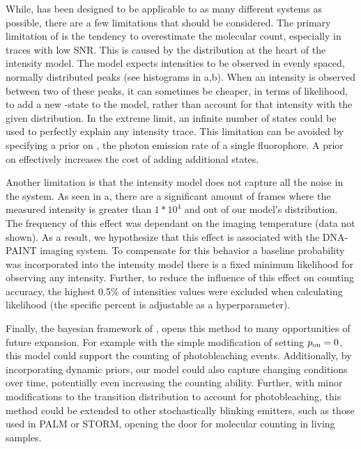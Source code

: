 While, \ours has been designed to be applicable to as many different systems as possible, 
there are a few limitations that should be considered.
    The primary limitation of \ours is the tendency to overestimate the molecular count, 
    especially in traces with low SNR. 
    This is caused by the distribution at the heart of the intensity model. 
    The model expects intensities to be observed in evenly spaced, normally distributed 
    peaks (see histograms in a,b).
    When an intensity is observed between two of these peaks, it can sometimes be cheaper, 
    in terms of likelihood, to add a new \z{}-state to the model,
    rather than account for that intensity with the given distribution.
    In the extreme limit, an infinite number of states could be used to perfectly explain any intensity trace.
    This limitation can be avoided by specifying a prior on \re, the photon emission rate of a single fluorophore. 
    A prior on \re effectively increases the cost of adding additional states.

Another limitation is that the intensity model does not capture all the noise in the system.
    As seen in a, there are a significant amount of frames where the 
    measured intensity is greater than $1*10^4$ and out of our model's distribution.
    The frequency of this effect was dependant on the imaging temperature (data not shown).
    As a result, we hypothesize that this effect is associated with the DNA-PAINT imaging system.
    To compensate for this behavior a baseline probability was incorporated into the intensity model 
    \ie there is a fixed minimum likelihood for observing any intensity.
    Further, to reduce the influence of this effect on counting accuracy, the highest 0.5\% of 
    intensities values were excluded when calculating likelihood (the specific percent is adjustable as a hyperparameter).

Finally, the bayesian framework of \ours, opens this method to many opportunities of future expansion.
    For example with the simple modification of setting $p_\text{on}=0$, this 
    model could support the counting of photobleaching events. 
    Additionally, by incorporating dynamic priors, our model could 
    also capture changing conditions over time, potentially even increasing the counting ability.
    Further, with minor modifications to the transition distribution to account for photobleaching,
    this method could be extended to other stochastically blinking emitters, 
    such as those used in PALM or STORM, opening the door for molecular counting in living samples.
